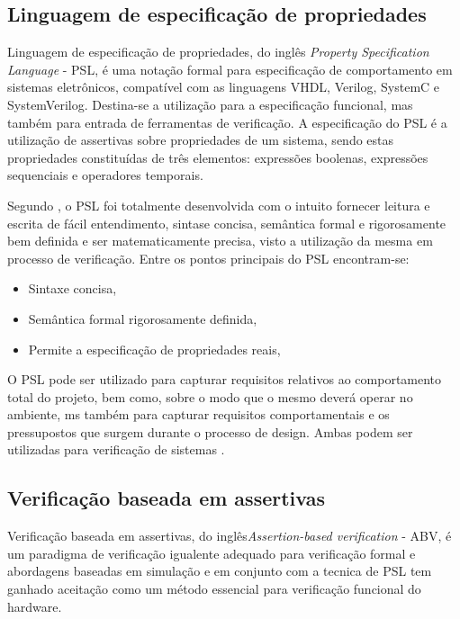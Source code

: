 \subsection{Linguagem de especificação de propriedades}
Linguagem de especificação de propriedades, do inglês \textit{Property Specification Language} - PSL, é uma notação formal para especificação de comportamento em sistemas eletrônicos, compatível com as linguagens VHDL, Verilog, SystemC e SystemVerilog. Destina-se a utilização para a especificação funcional, mas também para entrada de ferramentas de verificação. A especificação do PSL é a utilização de assertivas sobre propriedades de um sistema, sendo estas propriedades constituídas de três elementos: expressões boolenas, expressões sequenciais e operadores temporais\cite{IEEEPSL}.

\par
Segundo \cite{IEEEPSL}, o PSL foi totalmente desenvolvida com o intuito fornecer leitura e escrita de fácil entendimento, sintase concisa, semântica formal e rigorosamente bem definida e ser matematicamente precisa, visto a utilização da mesma em processo de verificação. Entre os pontos principais do PSL encontram-se:
\begin{itemize}
\item Sintaxe concisa,
\item Semântica formal rigorosamente definida,
\item Permite a especificação de propriedades reais,
\end{itemize}

\par
O PSL pode ser utilizado para capturar requisitos relativos ao comportamento total do projeto, bem como, sobre o modo que o mesmo deverá operar no ambiente, ms também para capturar requisitos comportamentais e os pressupostos que surgem durante o processo de design. Ambas podem ser utilizadas para verificação de sistemas \cite{IEEEPSL}.
\subsection{Verificação baseada em assertivas}
Verificação baseada em assertivas, do inglês\textit{Assertion-based verification} - ABV, é um paradigma de verificação igualente adequado para verificação formal e abordagens baseadas em simulação\cite{boule2005incorporating} e em conjunto com a tecnica de PSL tem ganhado aceitação como um método essencial para verificação funcional do hardware\cite{DahanCombining}.


